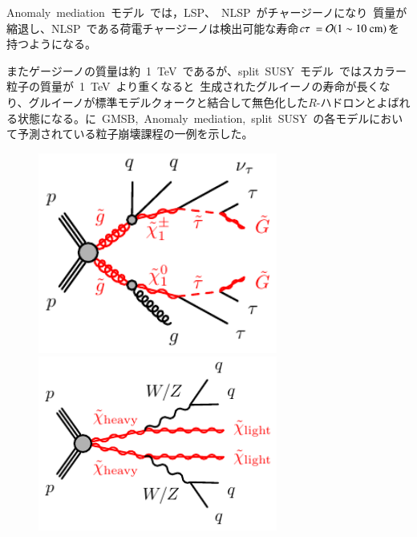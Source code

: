 Anomaly~mediation~モデル~\cite{AR:12}では，LSP、~NLSP~がチャージーノになり~質量が縮退し、NLSP~である荷電チャージーノは検出可能な寿命$c\tau~=\mathcal{O}(\rm{1}\sim\rm{10}~\rm{cm})$を持つようになる。

またゲージーノの質量は約~1~TeV~であるが、split~SUSY~モデル~\cite{AR:12}ではスカラー粒子の質量が~1~TeV~より重くなると~生成されたグルイーノの寿命が長くなり、グルイーノが標準モデルクォークと結合して無色化した$R$-ハドロンとよばれる状態になる。に~GMSB,~Anomaly~mediation,~split~SUSY~の各モデルにおいて予測されている粒子崩壊課程の一例を示した。

\begin{figure}[H]
	\begin{minipage}{0.49\hsize}
	\centering
    \includegraphics[width=0.7\textwidth]{img/diagram/gogo-qqgtautautauvGG-GMSB.pdf}
    \subcaption{}
    \end{minipage}
    \begin{minipage}{0.49\hsize}
    \centering
    \includegraphics[width=0.7\textwidth]{img/diagram/chichi-qqqq-XX.pdf}
    \subcaption{}
    \end{minipage}\\

\end{figure}
